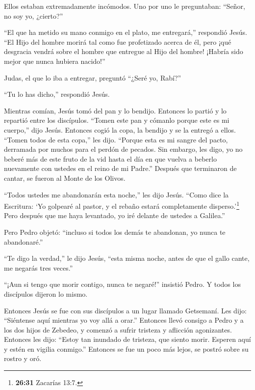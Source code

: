  Ellos estaban extremadamente incómodos. Uno por uno le
preguntaban: ``Señor, no soy yo, ¿cierto?''

 ``El que ha metido su mano conmigo en el plato, me
entregará,'' respondió Jesús.  ``El Hijo del hombre morirá
tal como fue profetizado acerca de él, pero ¡qué desgracia vendrá sobre
el hombre que entregue al Hijo del hombre! ¡Habría sido mejor que nunca
hubiera nacido!''

 Judas, el que lo iba a entregar, preguntó ``¿Seré yo,
Rabí?''

``Tu lo has dicho,'' respondió Jesús.

 Mientras comían, Jesús tomó del pan y lo bendijo. Entonces
lo partió y lo repartió entre los discípulos. ``Tomen este pan y cómanlo
porque este es mi cuerpo,'' dijo Jesús.  Entonces cogió la
copa, la bendijo y se la entregó a ellos. ``Tomen todos de esta copa,''
les dijo.  ``Porque esta es mi sangre del pacto, derramada
por muchos para el perdón de pecados.  Sin embargo, les
digo, yo no beberé más de este fruto de la vid hasta el día en que
vuelva a beberlo nuevamente con ustedes en el reino de mi Padre.''
 Después que terminaron de cantar, se fueron al Monte de
los Olivos.

 ``Todos ustedes me abandonarán esta noche,'' les dijo
Jesús. ``Como dice la Escritura: `Yo golpearé al pastor, y el rebaño
estará completamente disperso.'\footnote{\textbf{26:31} Zacarías 13:7.}
 Pero después que me haya levantado, yo iré delante de
ustedes a Galilea.''

 Pero Pedro objetó: ``incluso si todos los demás te
abandonan, yo nunca te abandonaré.''

 ``Te digo la verdad,'' le dijo Jesús, ``esta misma noche,
antes de que el gallo cante, me negarás tres veces.''

 ``¡Aun si tengo que morir contigo, nunca te negaré!''
insistió Pedro. Y todos los discípulos dijeron lo mismo.

 Entonces Jesús se fue con sus discípulos a un lugar
llamado Getsemaní. Les dijo: ``Siéntense aquí mientras yo voy allá a
orar.''  Entonces llevó consigo a Pedro y a los dos hijos
de Zebedeo, y comenzó a sufrir tristeza y aflicción agonizantes.
 Entonces les dijo: ``Estoy tan inundado de tristeza, que
siento morir. Esperen aquí y estén en vigilia conmigo.'' 
Entonces se fue un poco más lejos, se postró sobre su rostro y oró.

